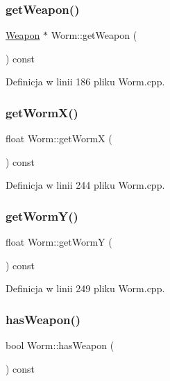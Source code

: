 \subsubsection{\texorpdfstring{get\+Weapon()}{getWeapon()}}
{\footnotesize\ttfamily \mbox{\hyperlink{class_weapon}{Weapon}} $\ast$ Worm\+::get\+Weapon (\begin{DoxyParamCaption}{ }\end{DoxyParamCaption}) const}



Definicja w linii 186 pliku Worm.\+cpp.

\mbox{\label{class_worm_a9787181c41ca3a4ac5098277e8a4a142}} 
\subsubsection{\texorpdfstring{get\+Worm\+X()}{getWormX()}}
{\footnotesize\ttfamily float Worm\+::get\+WormX (\begin{DoxyParamCaption}{ }\end{DoxyParamCaption}) const}



Definicja w linii 244 pliku Worm.\+cpp.

\mbox{\label{class_worm_aa1a5e5334f8d3e339f15b36a9af31f27}} 
\subsubsection{\texorpdfstring{get\+Worm\+Y()}{getWormY()}}
{\footnotesize\ttfamily float Worm\+::get\+WormY (\begin{DoxyParamCaption}{ }\end{DoxyParamCaption}) const}



Definicja w linii 249 pliku Worm.\+cpp.

\mbox{\label{class_worm_a15fc66d733ecfe886495910f591d1a34}} 
\subsubsection{\texorpdfstring{has\+Weapon()}{hasWeapon()}}
{\footnotesize\ttfamily bool Worm\+::has\+Weapon (\begin{DoxyParamCaption}{ }\end{DoxyParamCaption}) const}



